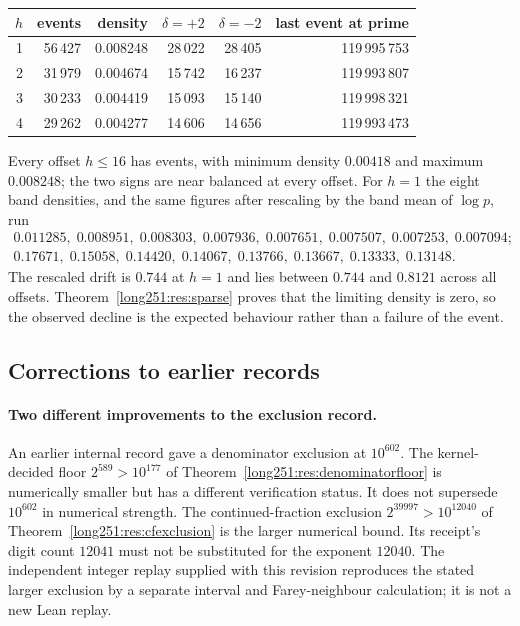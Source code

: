 \begin{center}
\small
\begin{tabular}{@{}rrrrrr@{}}
\toprule
$h$ & events & density & $\delta=+2$ & $\delta=-2$ & last event at prime\\
\midrule
1 & 56\,427 & 0.008248 & 28\,022 & 28\,405 & 119\,995\,753\\
2 & 31\,979 & 0.004674 & 15\,742 & 16\,237 & 119\,993\,807\\
3 & 30\,233 & 0.004419 & 15\,093 & 15\,140 & 119\,998\,321\\
4 & 29\,262 & 0.004277 & 14\,606 & 14\,656 & 119\,993\,473\\
\bottomrule
\end{tabular}
\end{center}

Every offset $h\le16$ has events, with minimum density $0.00418$ and maximum
$0.008248$; the two signs are near balanced at every offset.  For $h=1$ the
eight band densities, and the same figures after rescaling by the band mean of
$\log p$, run
\[
\begin{array}{l}
 0.011285,\;0.008951,\;0.008303,\;0.007936,\;0.007651,\;0.007507,\;0.007253,\;0.007094;\\[2pt]
 0.17671,\;0.15058,\;0.14420,\;0.14067,\;0.13766,\;0.13667,\;0.13333,\;0.13148 .
\end{array}
\]
The rescaled drift is $0.744$ at $h=1$ and lies between $0.744$ and $0.8121$
across all offsets.  Theorem~\ref{long251:res:sparse} proves that the limiting density
is zero, so the observed decline is the expected behaviour rather than a
failure of the event.

\subsection{Corrections to earlier records}\label{long251:sec:xr-corrections}

\paragraph{Two different improvements to the exclusion record.}
An earlier internal record gave a denominator exclusion at $10^{602}$.
The kernel-decided floor $2^{589}>10^{177}$ of
Theorem~\ref{long251:res:denominatorfloor} is numerically smaller but has a
different verification status.  It does not supersede $10^{602}$ in
numerical strength.  The continued-fraction exclusion
$2^{39997}>10^{12040}$ of Theorem~\ref{long251:res:cfexclusion} is the larger
numerical bound.  Its receipt's digit count $12041$ must not be substituted
for the exponent $12040$.  The independent integer replay supplied with
this revision reproduces the stated larger exclusion by a separate
interval and Farey-neighbour calculation; it is not a new Lean replay.

